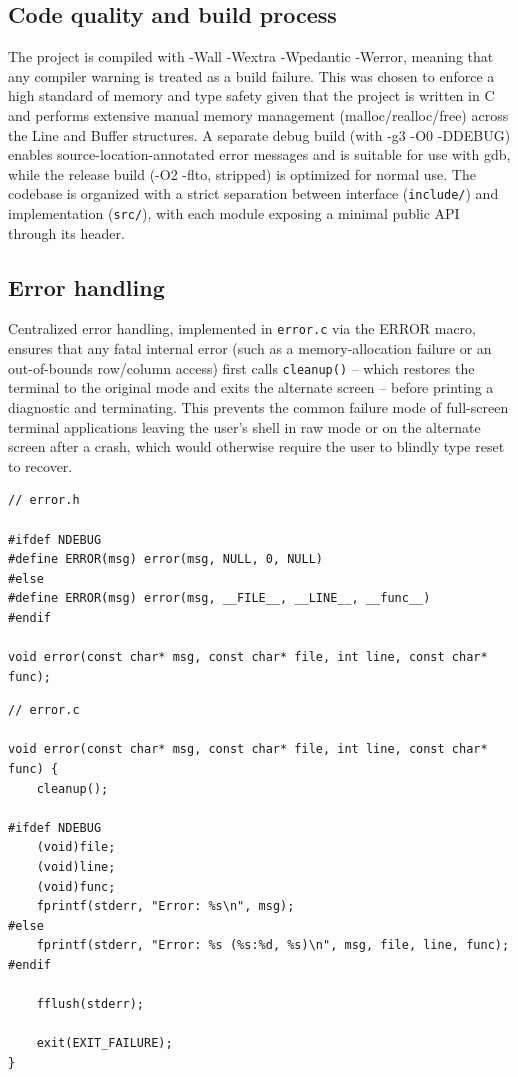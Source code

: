 \documentclass[journal]{IEEEtran}
\begin{document}
\subsection{Code quality and build process}
The project is compiled with -Wall -Wextra -Wpedantic -Werror, meaning that any compiler warning is treated as a build failure. This was chosen to enforce a high standard of memory and type safety given that the project is written in C and performs extensive manual memory management (malloc/realloc/free) across the Line and Buffer structures. A separate debug build (with -g3 -O0 -DDEBUG) enables source-location-annotated error messages and is suitable for use with gdb, while the release build (-O2 -flto, stripped) is optimized for normal use. The codebase is organized with a strict separation between interface (\texttt{include/}) and implementation (\texttt{src/}), with each module exposing a minimal public API through its header.

\subsection{Error handling}
Centralized error handling, implemented in \texttt{error.c} via the ERROR macro, ensures that any fatal internal error (such as a memory-allocation failure or an out-of-bounds row/column access) first calls \texttt{cleanup()} -- which restores the terminal to the original mode and exits the alternate screen -- before printing a diagnostic and terminating. This prevents the common failure mode of full-screen terminal applications leaving the user's shell in raw mode or on the alternate screen after a crash, which would otherwise require the user to blindly type reset to recover.

\begin{verbatim}
// error.h

#ifdef NDEBUG
#define ERROR(msg) error(msg, NULL, 0, NULL)
#else
#define ERROR(msg) error(msg, __FILE__, __LINE__, __func__)
#endif

void error(const char* msg, const char* file, int line, const char* func);
\end{verbatim}

\begin{verbatim}
// error.c

void error(const char* msg, const char* file, int line, const char* func) {
    cleanup();

#ifdef NDEBUG
    (void)file;
    (void)line;
    (void)func;
    fprintf(stderr, "Error: %s\n", msg);
#else
    fprintf(stderr, "Error: %s (%s:%d, %s)\n", msg, file, line, func);
#endif

    fflush(stderr);

    exit(EXIT_FAILURE);
}
\end{verbatim}
\end{document}
